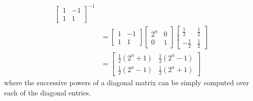 \begin{solution}
\begin{align*}
\begin{bmatrix}
1 & -1 \\
1 & 1
\end{bmatrix}^{-1} \\
&= 
\begin{bmatrix}
1 & -1 \\
1 & 1
\end{bmatrix}
\begin{bmatrix}
2^n & 0 \\
0 & 1
\end{bmatrix}
\begin{bmatrix}
\frac{1}{2} & \frac{1}{2} \\
-\frac{1}{2} & \frac{1}{2} 
\end{bmatrix} \\
&= \begin{bmatrix}
\frac{1}{2}(2^n + 1) & \frac{1}{2}(2^n - 1) \\
\frac{1}{2}(2^n - 1) & \frac{1}{2}(2^n + 1)
\end{bmatrix}
\end{align*}
where the successive powers of a diagonal matrix can be simply computed over each of the diagonal entries.
\end{solution}


